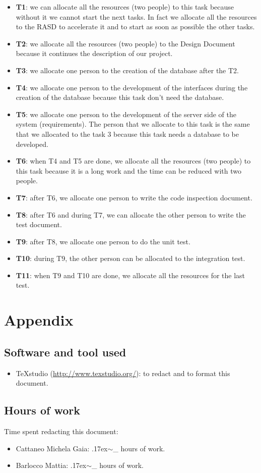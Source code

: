 \documentclass[18pt,oneside,a4paper, titlepage]{article}
\begin{document}
	\begin{itemize}
		\item \textbf{T1}: we can allocate all the resources (two people) to this task because without it we cannot start the next tasks. In fact we allocate all the resources to the RASD to accelerate it and to start as soon as possible the other tasks.
		\item \textbf{T2}: we allocate all the resources (two people) to the Design Document because it continues the description of our project.
		\item \textbf{T3}: we allocate one person to the creation of the database after the T2.
		\item \textbf{T4}: we allocate one person to the development of the interfaces during the creation of the database because this task don't need the database.
		\item \textbf{T5}: we allocate one person to the development of the server side of the system (requirements). The person that we allocate to this task is the same that we allocated to the task 3 because this task needs a database to be developed.
		\item \textbf{T6}: when T4 and T5 are done, we allocate all the resources (two people) to this task because it is a long work and the time can be reduced with two people.
		\item \textbf{T7}: after T6, we allocate one person to write the code inspection document.
		\item \textbf{T8}: after T6 and during T7, we can allocate the other person to write the test document.
		\item \textbf{T9}: after T8, we allocate one person to do the unit test.
		\item \textbf{T10}: during T9, the other person can be allocated to the integration test.
		\item \textbf{T11}: when T9 and T10 are done, we allocate all the resources for the last test.
	\end{itemize}

\newpage
	
\newpage
\section{Appendix}

	\subsection{Software and tool used}
		\begin{itemize}
			\item TeXstudio (\url{http://www.texstudio.org/}): to redact and to format this document.
		\end{itemize}
	
	\subsection{Hours of work}
		Time spent redacting this document:
		\begin{itemize}
			\item Cattaneo Michela Gaia: {\raise.17ex\hbox{$\scriptstyle\sim$}}\_ hours of work.
			\item Barlocco Mattia: {\raise.17ex\hbox{$\scriptstyle\sim$}}\_ hours of work.
		\end{itemize}
\end{document}
